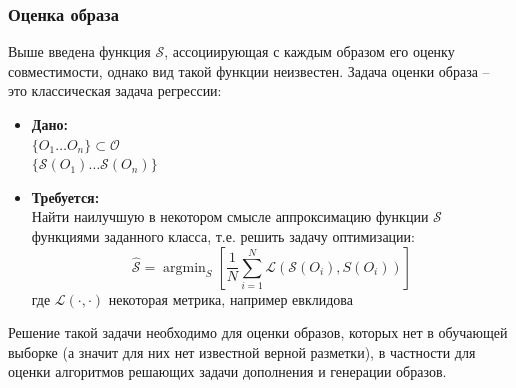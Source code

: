 \documentclass[a4paper,14pt]{extarticle}
\DeclareMathOperator*{\argmax}{argmax}
\DeclareMathOperator*{\argmin}{argmin}
\begin{document}
			\subsubsection{Оценка образа}
				Выше введена функция $\mathcal{S}$, ассоциирующая с каждым образом его оценку совместимости, однако вид такой функции неизвестен. Задача оценки образа -- это классическая задача регрессии:\\
				\begin{itemize}
					\item[] \textbf{Дано:}\\
						$\{O_1\dots O_n\}\subset \mathcal{O}$\\
						$\{\mathcal{S}(O_1)\dots\mathcal{S}(O_n)\}$
					\item[] \textbf{Требуется:}\\
					Найти наилучшую в некотором смысле аппроксимацию функции $\mathcal{S}$ функциями заданного класса, т.е. решить задачу оптимизации:\\
					$$\hat{\mathcal{S}}= \argmin_{S}\left[\frac{1}{N} \sum\limits_{i=1}^N\mathcal{L}(\mathcal{S}(O_i), S(O_i))\right]$$
					где $\mathcal{L}(\cdot, \cdot)$ некоторая метрика, например евклидова
				\end{itemize}
			Решение такой задачи необходимо для оценки образов, которых нет в обучающей выборке (а значит для них нет известной верной разметки), в частности для оценки алгоритмов решающих задачи дополнения и генерации образов.
%			
				
\end{document}
